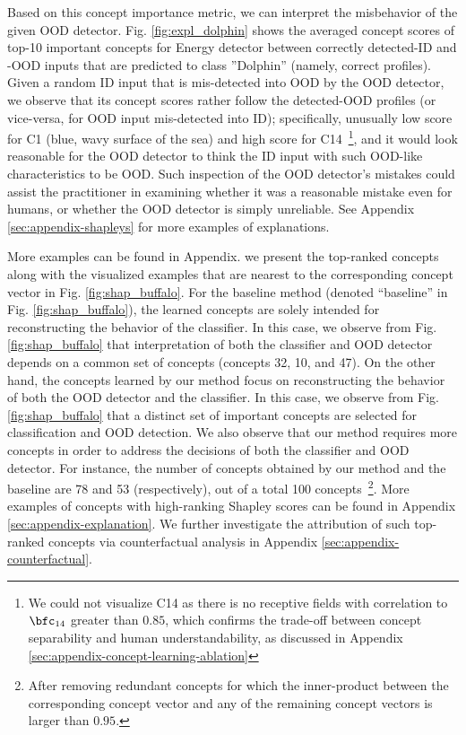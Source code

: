 Based on this concept importance metric, we can interpret the misbehavior of the given OOD detector.
Fig. \ref{fig:expl_dolphin} shows the averaged concept scores of top-10 important concepts for Energy detector between correctly detected-ID and -OOD inputs that are predicted to class ''Dolphin'' (namely, correct profiles).
Given a random ID input that is mis-detected into OOD by the OOD detector, we observe that its concept scores rather follow the detected-OOD profiles (or vice-versa, for OOD input mis-detected into ID); specifically, unusually low score for C1 (blue, wavy surface of the sea) and high score for C14~\footnote{We could not visualize C14 as there is no receptive fields with correlation to $\bfc_{14}$ greater than $0.85$, which confirms the trade-off between concept separability and human understandability, as discussed in Appendix \ref{sec:appendix-concept-learning-ablation}}, and it would look reasonable for the OOD detector to think the ID input with such OOD-like characteristics to be OOD. 
Such inspection of the OOD detector's mistakes could assist the practitioner in examining whether it was a reasonable mistake even for humans, or whether the OOD detector is simply unreliable. See Appendix \ref{sec:appendix-shapleys} for more examples of explanations.

More examples can be found in Appendix.
we present the top-ranked concepts along with the visualized examples that are nearest to the corresponding concept vector in Fig. \ref{fig:shap_buffalo}.
For the baseline method \citep{yeh2020completeness} (denoted ``baseline'' in Fig. \ref{fig:shap_buffalo}), the learned concepts are solely intended for reconstructing the behavior of the classifier. 
In this case, we observe from Fig. \ref{fig:shap_buffalo} that 
interpretation of both the classifier and OOD detector depends on a common set of concepts (\ie concepts 32, 10, and 47).
On the other hand, the concepts learned by our method focus on reconstructing the behavior of both the OOD detector and the classifier. In this case, we observe from Fig. \ref{fig:shap_buffalo} that a distinct set of important concepts are selected for classification and OOD detection.
We also observe that our method requires more concepts in order to address the decisions of both the classifier and OOD detector.
For instance, the number of concepts obtained by our method and the baseline are 78 and 53 (respectively), out of a total 100 concepts~\footnote{After removing redundant concepts for which the inner-product between the corresponding concept vector and any of the remaining concept vectors is larger than $0.95$.}.
More examples of concepts with high-ranking Shapley scores can be found in Appendix \ref{sec:appendix-explanation}.
We further investigate the attribution of such top-ranked concepts via counterfactual analysis in Appendix \ref{sec:appendix-counterfactual}.

